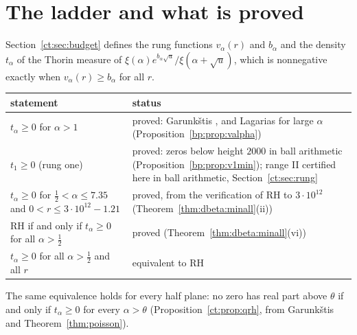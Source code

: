 \section{The ladder and what is proved}\label{kr:sec:ladder}
Section~\ref{ct:sec:budget} defines the rung functions $v_\alpha(r)$ and $b_\alpha$ and the density $t_\alpha$ of the Thorin measure of $\xi(\alpha)e^{b_\alpha\sqrt u}/\xi(\alpha+\sqrt u)$, which is nonnegative exactly when $v_\alpha(r)\ge b_\alpha$ for all $r$.
\begin{center}
\small
\begin{tabular}{p{}p{}}
\toprule
statement & status\\
\midrule
$t_\alpha\ge0$ for $\alpha>1$ & proved: Garunk\v{s}tis \cite{Garunkstis02}, and Lagarias \cite{Lagarias} for large $\alpha$ (Proposition~\ref{bp:prop:valpha})\\
$t_1\ge0$ (rung one) & proved: zeros below height $2000$ in ball arithmetic (Proposition~\ref{bp:prop:v1min}); range II certified here in ball arithmetic, Section~\ref{ct:sec:rung}\\
$t_\alpha\ge0$ for $\frac12<\alpha\le7.35$ and $0<r\le3\cdot10^{12}-1.21$ & proved, from the verification of RH to $3\cdot10^{12}$ \cite{PT21} (Theorem~\ref{thm:dbeta:minall}(ii))\\
RH if and only if $t_\alpha\ge0$ for all $\alpha>\frac12$ & proved (Theorem~\ref{thm:dbeta:minall}(vi))\\
$t_\alpha\ge0$ for all $\alpha>\frac12$ and all $r$ & equivalent to RH\\
\bottomrule
\end{tabular}
\end{center}
The same equivalence holds for every half plane: no zero has real part above $\theta$ if and only if $t_\alpha\ge0$ for every $\alpha>\theta$ (Proposition~\ref{ct:prop:qrh}, from Garunk\v{s}tis \cite{Garunkstis02} and Theorem~\ref{thm:poisson}).

